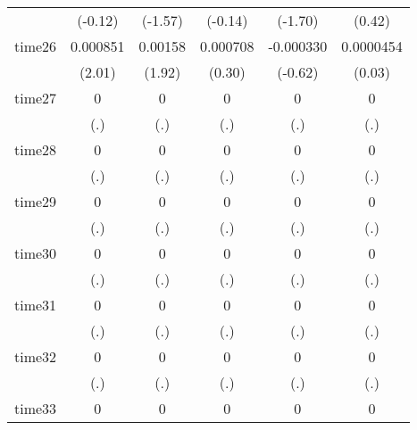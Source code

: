 \begin{table}[htbp]
\begin{tabular}{l*{5}{c}}
            &     (-0.12)         &     (-1.57)         &     (-0.14)         &     (-1.70)         &      (0.42)         \\
time26      &    0.000851\sym{*}  &     0.00158         &    0.000708         &   -0.000330         &   0.0000454         \\
            &      (2.01)         &      (1.92)         &      (0.30)         &     (-0.62)         &      (0.03)         \\
time27      &           0         &           0         &           0         &           0         &           0         \\
            &         (.)         &         (.)         &         (.)         &         (.)         &         (.)         \\
time28      &           0         &           0         &           0         &           0         &           0         \\
            &         (.)         &         (.)         &         (.)         &         (.)         &         (.)         \\
time29      &           0         &           0         &           0         &           0         &           0         \\
            &         (.)         &         (.)         &         (.)         &         (.)         &         (.)         \\
time30      &           0         &           0         &           0         &           0         &           0         \\
            &         (.)         &         (.)         &         (.)         &         (.)         &         (.)         \\
time31      &           0         &           0         &           0         &           0         &           0         \\
            &         (.)         &         (.)         &         (.)         &         (.)         &         (.)         \\
time32      &           0         &           0         &           0         &           0         &           0         \\
            &         (.)         &         (.)         &         (.)         &         (.)         &         (.)         \\
time33      &           0         &           0         &           0         &           0         &           0         \\

\end{tabular}
\end{table}
